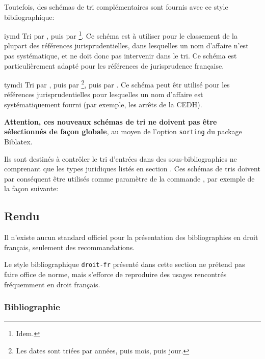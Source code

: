 \documentclass{ltxdockit}
\newcommand*{\biblatex}{Biblatex\xspace}
\newcommand*{\bibstylename}{droit-fr\xspace}
\begin{document}
Toutefois, des schémas de tri complémentaires sont fournis avec ce style bibliographique:
\begin{keymarglist}
\item[iymd] Tri par , puis par \footnote{Idem.}. Ce schéma est à utiliser pour le classement de la plupart des références jurisprudentielles, dans lesquelles un nom d'affaire n'est pas systématique, et ne doit donc pas intervenir dans le tri. Ce schéma est particulièrement adapté pour les références de jurisprudence française.
\item[tymdi] Tri par , puis par \footnote{Les dates sont triées par années, puis mois, puis jour.}, puis par . Ce schéma peut êtr utilisé pour les références jurisprudentielles pour lesquelles un nom d'affaire est systématiquement fourni (par exemple, les arrêts de la CEDH).

\end{keymarglist}

\textbf{Attention, ces nouveaux schémas de tri ne doivent pas être sélectionnés de façon globale}, au moyen de l'option \texttt{sorting} du package \biblatex. 

Ils sont destinés à contrôler le tri d'entrées dans des sous-bibliographies ne comprenant que les types juridiques listés en section . Ces schémas de tris doivent par conséquent être utilisés comme paramètre de la commande , par exemple de la façon suivante:

\begin{ltxexample}
\printbibliography[..., type=<<jurisdiction>>, sorting=<<iymd>>]
\end{ltxexample}
%

\subsection{Rendu}

Il n'existe aucun standard officiel pour la présentation des bibliographies en droit français, seulement des recommandations.

Le style bibliographique \texttt{\bibstylename} présenté dans cette section ne prétend pas faire office de norme, mais s'efforce de reproduire des usages rencontrés fréquemment en droit français.

\subsubsection{Bibliographie}
\end{document}
